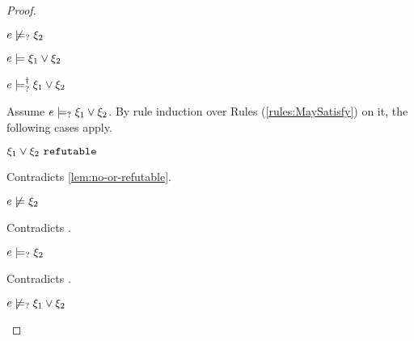 \begin{proof}
\begin{byCases}
\begin{byCases}
\begin{pfsteps*}
        \item $e \not\models_{?} \xi_2$  
        \item $e \models \xi_1 \vee \xi_2$  
        \item $e \models_{?}^{\dag} \xi_1 \vee \xi_2$ 
        \end{pfsteps*}
        Assume $e \models_{?} \xi_1 \vee \xi_2$. By rule induction over Rules (\ref{rules:MaySatisfy}) on it, the following cases apply.
        \begin{byCases}
        \item[\text{(\ref{rule:CMSNotVal})}]
            \begin{pfsteps*}
            \item $\xi_1 \vee \xi_2 ~\mathtt{refutable}$ 
            \end{pfsteps*}
            Contradicts \autoref{lem:no-or-refutable}.
        \item[\text{(\ref{rule:CMSOr1})}]
            \begin{pfsteps*}
            \item $e \not\models \xi_2$ 
            \end{pfsteps*}
            Contradicts .
        \item[\text{(\ref{rule:CMSOr2})}]
            \begin{pfsteps*}
            \item $e \models_{?} \xi_2$ 
            \end{pfsteps*}
            Contradicts .
        \end{byCases}
        \begin{pfsteps*}
        \item $e \not\models_{?} \xi_1 \vee \xi_2$ 
        \end{pfsteps*}
        

\end{byCases}
\end{byCases}
\end{proof}
